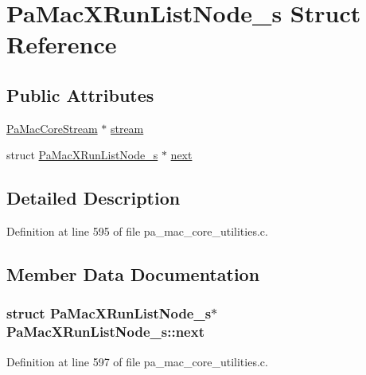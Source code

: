 \hypertarget{struct_pa_mac_x_run_list_node__s}{}\section{Pa\+Mac\+X\+Run\+List\+Node\+\_\+s Struct Reference}
\label{struct_pa_mac_x_run_list_node__s}
\subsection*{Public Attributes}
\begin{DoxyCompactItemize}
\item 
\hyperlink{struct_pa_mac_core_stream}{Pa\+Mac\+Core\+Stream} $\ast$ \hyperlink{struct_pa_mac_x_run_list_node__s_a53f8dd20a19188e55a2f979917f24d80}{stream}
\item 
struct \hyperlink{struct_pa_mac_x_run_list_node__s}{Pa\+Mac\+X\+Run\+List\+Node\+\_\+s} $\ast$ \hyperlink{struct_pa_mac_x_run_list_node__s_a4f810fe586d02e14ac39053876b605c9}{next}
\end{DoxyCompactItemize}


\subsection{Detailed Description}


Definition at line 595 of file pa\+\_\+mac\+\_\+core\+\_\+utilities.\+c.



\subsection{Member Data Documentation}
\subsubsection[{\texorpdfstring{next}{next}}]{\setlength{\rightskip}{0pt plus 5cm}struct {\bf Pa\+Mac\+X\+Run\+List\+Node\+\_\+s}$\ast$ Pa\+Mac\+X\+Run\+List\+Node\+\_\+s\+::next}\hypertarget{struct_pa_mac_x_run_list_node__s_a4f810fe586d02e14ac39053876b605c9}{}\label{struct_pa_mac_x_run_list_node__s_a4f810fe586d02e14ac39053876b605c9}


Definition at line 597 of file pa\+\_\+mac\+\_\+core\+\_\+utilities.\+c.

